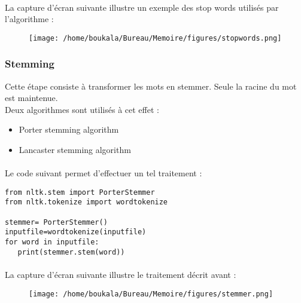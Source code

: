 \documentclass[12pt, a4paper, oneside]{book}
\begin{document}
\paragraph{}
La capture d'écran suivante illustre un exemple des stop words utilisés par l'algorithme :



\begin{figure}[h!]
\begin{center}
\texttt{[image: /home/boukala/Bureau/Memoire/figures/stopwords.png]}
\end{center}
\end{figure}






\subsubsection{Stemming}

Cette étape consiste à transformer les mots en stemmer.
Seule la racine du mot est maintenue.\\
Deux algorithmes sont utilisés à cet effet :\\ 
\begin{itemize}
\item Porter stemming algorithm 
\item Lancaster stemming algorithm

\end{itemize}

\paragraph{}
Le code suivant permet d'effectuer un tel traitement : 

\begin{verbatim}
from nltk.stem import PorterStemmer
from nltk.tokenize import wordtokenize

stemmer= PorterStemmer()
inputfile=wordtokenize(inputfile)
for word in inputfile:
   print(stemmer.stem(word))
\end{verbatim}
\paragraph{}
La capture d'écran suivante illustre le traitement décrit avant :


\begin{figure}[h!]
\begin{center}
\texttt{[image: /home/boukala/Bureau/Memoire/figures/stemmer.png]}
\end{center}
\end{figure}
\end{document}
